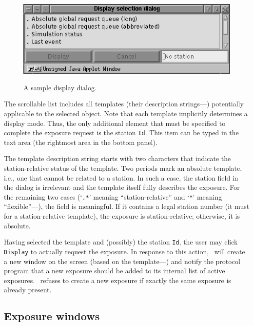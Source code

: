 \begin{figure}
\begin{center}
\ \includegraphics[scale=0.5]{FIGURES/dsddial.png}
\caption{A sample display dialog.}%
\end{center}
\end{figure}

The scrollable list includes all templates (their description
strings---) potentially applicable to the selected object.
Note that each template implicitly determines a display mode.
Thus, the only additional
element that must be specified to complete the exposure request is
the station {\tt Id}.
This item can be typed in the text area (the rightmost area
in the bottom panel).

The template description string starts with two characters that indicate the
station-relative status of the template.
Two periods mark an absolute template, i.e., one that cannot be related to
a station.
In such a case, the station field in the dialog is irrelevant and the template
itself fully describes the exposure.
For the remaining two cases (`{\tt .*}' meaning ``station-relative'' and
`{\tt **}' meaning ``flexible''---),
the field is meaningful.
If it contains a legal station number (it must for a station-relative
template), the exposure is station-relative; otherwise, it is absolute.

Having selected the template and (possibly) the station {\tt Id},
the user may click {\tt Display} to actually request the exposure.
In response to this action, \dsd\ will create a new window on the screen
(based on the template---) and notify
the protocol program that a new exposure should be added to its internal
list of active exposures.
\dsd\ refuses to create a new exposure
if exactly the same exposure is already present.

\subsection{Exposure windows}
\label{rm_ds_wm}

